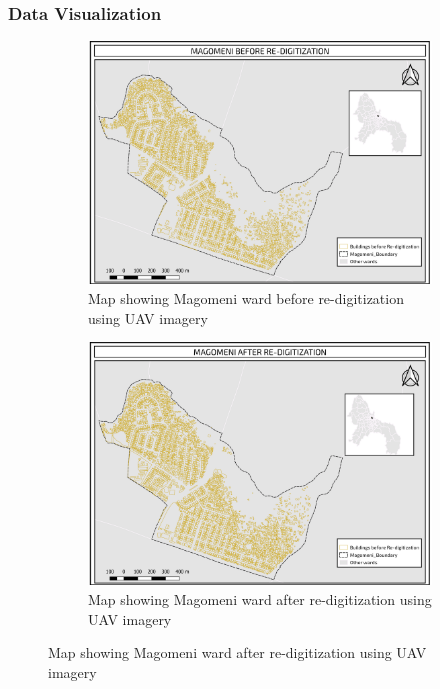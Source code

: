 \documentclass[a4paper,12pt,twoside]{article}
\begin{document}
\subsubsection{Data Visualization}
\begin{figure}
  \begin{subfigure}[b]{0.5\textwidth}
    \includegraphics[width=\textwidth]{Magomeni_Before_Redigitization.png}
   \color{RHgreen}\caption{Map showing Magomeni ward before re-digitization using UAV imagery}
    \label{fig:1}
  \end{subfigure}
  \begin{subfigure}[b]{0.5\textwidth}
    \includegraphics[width=\textwidth]{Magomeni_After_Redigitization.png}
    \color{RHgreen}\caption{Map showing Magomeni ward after re-digitization using UAV imagery}
    \label{fig:2}
  \end{subfigure}
\end{figure}
\end{document}
